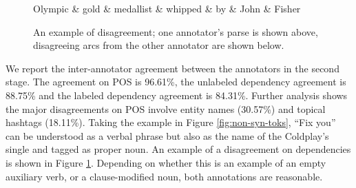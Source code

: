 \documentclass[11pt,a4paper]{article}
\begin{document}
\begin{figure}
\centering
\small
\begin{dependency}[edge slant=2, text only label, label style=above]
	\begin{deptext}
		Olympic \& gold \& medallist \& whipped \& by \& John \& Fisher \\
	\end{deptext}
\end{dependency}
\caption{An example of disagreement; one annotator's parse is shown above, disagreeing arcs from the other
  annotator are shown below.}\label{fig:disagree}
\end{figure}

We report the inter-annotator agreement between the annotators
in the second stage. The agreement on POS is 96.61\%, the unlabeled
dependency agreement is 88.75\% and the labeled dependency agreement
is 84.31\%. Further analysis shows the major disagreements on POS
involve entity names (30.57\%) and topical hashtags (18.11\%).
Taking the example in Figure \ref{fig:non-syn-toks}, ``Fix you'' can
be understood as a verbal phrase but also as the name of the Coldplay's
single and tagged as proper noun. An example of a disagreement on
dependencies is shown in Figure \ref{fig:disagree}.  Depending on
whether this is an example of an empty auxiliary verb, or a clause-modified
noun, both annotations are reasonable. 
\end{document}
